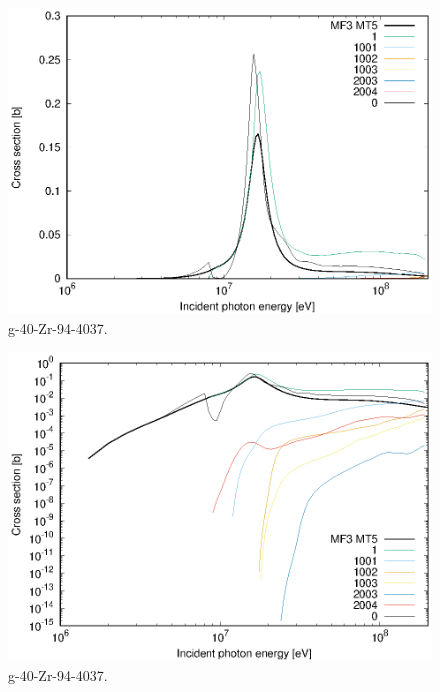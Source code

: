 \begin{figure}
 \includegraphics[width=\linewidth]{eps/g_40-Zr-94_4037.eps}
  \caption{g-40-Zr-94-4037.}
\end{figure}
\begin{figure}
 \includegraphics[width=\linewidth]{eps-log/g_40-Zr-94_4037.eps}
 \caption{g-40-Zr-94-4037.}
\end{figure}
\newpage \clearpage


